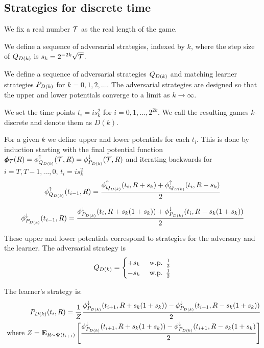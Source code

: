 \documentclass{article}[12pt]
\begin{document}
\subsection{Strategies for discrete time}
\label{sec:disc-game-strategies}

We fix a real number $\mathcal{T}$ as the real length of the game.

We define a sequence of adversarial strategies, indexed by $k$, where the step size of $Q_{D(k)}$ is $s_k = 2^{-2k} \sqrt{\mathcal{T}}$.

We define a sequence of adversarial strategies $Q_{D(k)}$ and
matching learner strategies $P_{D(k)}$ for $k=0,1,2,\ldots$. The
adversarial strategies are designed so that the upper and lower
potentials converge to a limit as $k \to \infty$.

We set the time points $t_i =i s_k^2$ for $i=0,1,\ldots,2^{2k}$. We
call the resulting games $k$-discrete and denote them as $D(k)$.

For a given $k$ we define upper and lower potentials for each
$t_i$. This is done by induction starting with the final potential
function  $\pmb{\phi}_{\mathcal{T}}(R)=\phi_{Q_{D(k)}}^{\uparrow}(\mathcal{T}, R)=\phi_{P_{D(k)}}^{\downarrow}(\mathcal{T}, R)$ and iterating
backwards for  $i=T,T-1,\ldots,0$, $t_i = i s_k^2$ 
 \begin{equation} \label{eqn:backward-iteration-lower-discrete}
   \phi_{Q_{D(k)}}^{\uparrow}(t_{i-1}, R) = \frac{\phi_{Q_{D(k)}}^{\uparrow}(t_i,R+s_k) + \phi_{Q_{D(k)}}^{\uparrow}(t_i,R-s_k)}{2}
 \end{equation}

 \begin{equation} \label{eqn:backward-iteration-upper-recursion-discrete}
   \phi_{P_{D(k)}}^{\downarrow}(t_{i-1}, R) = \frac{\phi_{P_{D(k)}}^{\downarrow}(t_i,R+s_k(1+s_k)) + \phi_{P_{D(k)}}^{\downarrow}(t_i,R-s_k(1+s_k))}{2}
 \end{equation}

 
These upper and lower potentials correspond to strategies for the
adversary and the learner.
The adversarial strategy is 
\begin{equation} \label{eqn:adv-strat-dk}
  Q_{D(k)}=  \begin{cases}
    +s_k & \mbox{ w.p. } \frac{1}{2}\\
    -s_k & \mbox{ w.p. } \frac{1}{2}\\
  \end{cases}
\end{equation}

The learner's strategy is:
\begin{eqnarray} \label{eqn:learner-strat-1c}
  P_{D(k)}(t_{i},R) = \frac{1}{Z}
  \frac{\phi_{P_{D(k)}}^{\downarrow}(t_{i+1},R+s_k(1+s_k)) -
  \phi_{P_{D(k)}}^{\downarrow}(t_{i+1},R-s_k(1+s_k))}{2} \\
  \mbox{ where } Z = {\bf E}_{R \sim {\bf \Psi}(t_{i+1})}\left[ \frac{\phi_{P_{D(k)}}^{\downarrow}(t_{i+1},R+s_k(1+s_k)) -
  \phi_{P_{D(k)}}^{\downarrow}(t_{i+1},R-s_k(1+s_k)}{2} \right] \nonumber
\end{eqnarray}
\end{document}
